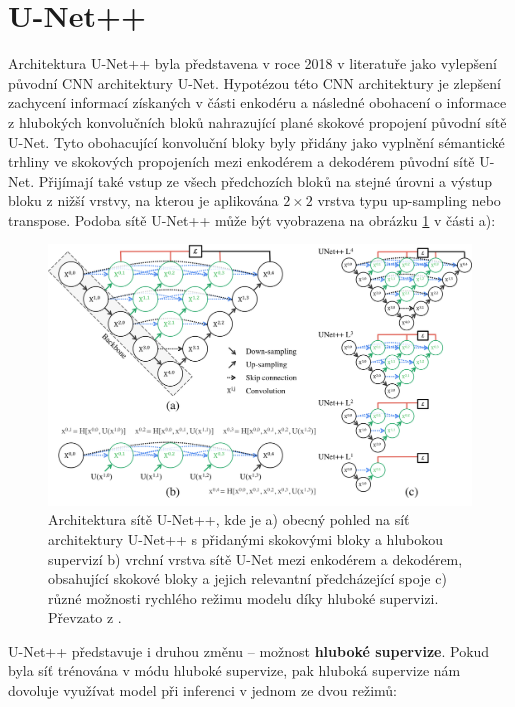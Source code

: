 \section{U-Net++}
\label{sec:Chapter23}

Architektura U-Net++ byla představena v roce 2018 v literatuře \cite{unetpp} jako vylepšení původní CNN architektury U-Net. Hypotézou této CNN architektury je zlepšení zachycení informací získaných v části enkodéru a následné obohacení o informace z hlubokých konvolučních bloků nahrazující plané skokové propojení původní sítě U-Net. Tyto obohacující konvoluční bloky byly přidány jako vyplnění sémantické trhliny ve skokových propojeních mezi enkodérem a dekodérem původní sítě U-Net. Přijímají také vstup ze všech předchozích bloků na stejné úrovni a výstup bloku z nižší vrstvy, na kterou je aplikována $2\times2$ vrstva typu up-sampling nebo transpose. Podoba sítě U-Net++ může být vyobrazena na obrázku \ref{fig:unetpp} v části a):

\begin{figure}[H]
\centering
\includegraphics[width=1.0\textwidth,keepaspectratio]{Figures/unetpp.png}
\caption[Architektura sítě U-Net++]
{Architektura sítě U-Net++, kde je a) obecný pohled na síť architektury U-Net++ s přidanými skokovými bloky a hlubokou supervizí \uppercase\expandafter{ \relax} b) vrchní vrstva sítě U-Net mezi enkodérem a dekodérem, obsahující skokové bloky a jejich relevantní předcházející spoje c) různé možnosti rychlého režimu modelu díky hluboké supervizi. Převzato z \cite{unetpp}. }
\label{fig:unetpp}
\end{figure}

U-Net++ představuje i druhou změnu -- možnost \textbf{hluboké supervize}. Pokud byla síť trénována v módu hluboké supervize, pak hluboká supervize nám dovoluje využívat model při inferenci v jednom ze dvou režimů:

